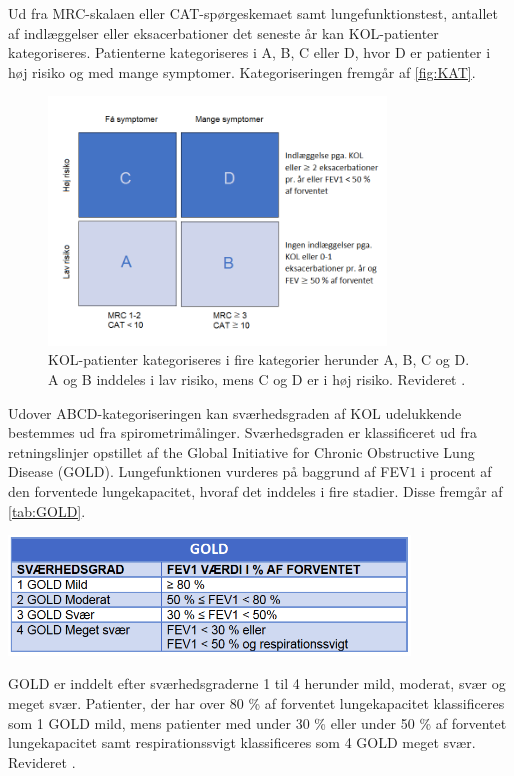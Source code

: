 \noindent
Ud fra MRC-skalaen eller CAT-spørgeskemaet samt lungefunktionstest, antallet af indlæggelser eller eksacerbationer det seneste år kan KOL-patienter kategoriseres. Patienterne kategoriseres i A, B, C eller D, hvor D er patienter i høj risiko og med mange symptomer. Kategoriseringen fremgår af \autoref{fig:KAT}.

\begin{figure} [H]
\centering
\includegraphics[width=0.8\textwidth]{figures/KAT}
\caption{KOL-patienter kategoriseres i fire kategorier herunder A, B, C og D. A og B inddeles i lav risiko, mens C og D er i høj risiko. Revideret \cite{Basisbogen2016}.}
\label{fig:KAT}
\end{figure} 
 
\noindent
Udover ABCD-kategoriseringen kan sværhedsgraden af KOL udelukkende bestemmes ud fra spirometrimålinger.  Sværhedsgraden er klassificeret ud fra retningslinjer opstillet af the Global Initiative for Chronic Obstructive Lung Disease (GOLD).\cite{dsam2016} Lungefunktionen vurderes på baggrund af FEV$1$ i procent af den forventede lungekapacitet, hvoraf det inddeles i fire stadier. Disse fremgår af \autoref{tab:GOLD}.

\begin{table} [H]
\centering
\includegraphics[width=0.8\textwidth]{figures/GOLD}
\caption{GOLD er inddelt efter sværhedsgraderne  1 til 4 herunder mild, moderat, svær og meget svær. Patienter, der har over 80 \% af forventet lungekapacitet klassificeres som 1 GOLD mild, mens patienter med under 30 \% eller under 50 \% af forventet lungekapacitet samt respirationssvigt klassificeres som 4 GOLD meget svær. Revideret \cite{Basisbogen2016}.}
\label{tab:GOLD}
\end{table} 

